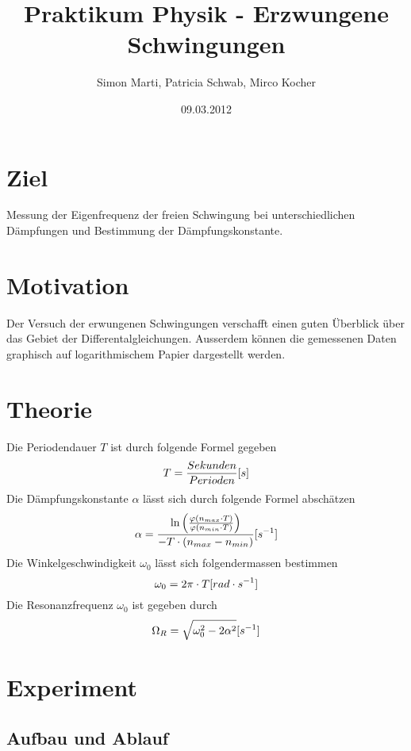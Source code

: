 \documentclass[12pt,a4paper]{article}
\title{Praktikum Physik - Erzwungene Schwingungen}
\author{Simon Marti, Patricia Schwab, Mirco Kocher}
\date{09.03.2012}
\begin{document}
\maketitle

\section*{Ziel}
Messung der Eigenfrequenz der freien Schwingung bei unterschiedlichen D\"ampfungen und Bestimmung der D\"ampfungskonstante.

\section*{Motivation}
Der Versuch der erwungenen Schwingungen verschafft einen guten \"Uberblick \"uber das Gebiet der Differentalgleichungen. Ausserdem k\"onnen die gemessenen Daten graphisch auf logarithmischem Papier dargestellt werden. 

\section*{Theorie}
Die Periodendauer $T$ ist durch folgende Formel gegeben
\begin{equation}
T = \frac{Sekunden}{Perioden} \mbox [{s}]
\end{equation}
Die D\"ampfungskonstante $\alpha$ l\"asst sich durch folgende Formel absch\"atzen
\begin{equation}
\alpha = \frac{\ln\left( \frac{\varphi(n_{max} \cdot T)}{\varphi(n_{min} \cdot T)}\right)}{-T\cdot (n_{max} - n_{min})} \mbox [{s}^{-1}]
\end{equation}
Die Winkelgeschwindigkeit $\omega_0$ l\"asst sich folgendermassen bestimmen
\begin{equation}
\omega_0 = 2\pi \cdot T \mbox[{rad \cdot s}^{-1}]
\end{equation}
Die Resonanzfrequenz $\omega_0$ ist gegeben durch
\begin{equation}
\Omega_R = \sqrt{\omega_0^2 - 2\alpha^2} \mbox [{s}^{-1}]
\end{equation}

\newpage

\section*{Experiment}

\subsection*{Aufbau und Ablauf}
\end{document}
